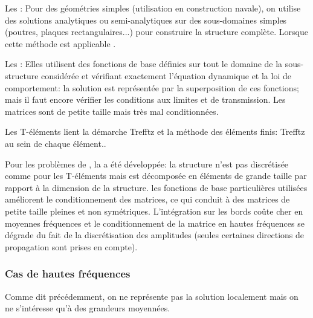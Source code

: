 \bigskip
Les : Pour des géométries simples (utilisation en construction navale), on utilise des solutions analytiques ou semi-analytiques sur des sous-domaines simples (poutres, plaques rectangulaires...) pour construire la structure complète. Lorsque cette méthode est applicable .

\bigskip
Les : Elles utilisent des fonctions de base définies sur tout le domaine de la sous-structure considérée et vérifiant exactement l'équation dynamique et la loi de comportement: la solution est représentée par la superposition de ces fonctions; mais il faut encore vérifier les conditions aux limites et de transmission. Les matrices sont de petite taille mais très mal conditionnées.

Les T-éléments lient la démarche Trefftz et la méthode des éléments finis: Trefftz au sein de chaque élément..

Pour les problèmes de , la  a été développée: la structure n'est pas discrétisée comme pour les T-éléments mais est décomposée en éléments de grande taille par rapport à la dimension de la structure. les fonctions de base particulières utilisées améliorent le conditionnement des matrices, ce qui conduit à des matrices de petite taille pleines et non symétriques. L'intégration sur les bords coûte cher en moyennes fréquences et le conditionnement de la matrice en hautes fréquences se dégrade du fait de la discrétisation des amplitudes (seules certaines directions de propagation sont prises en compte).

\medskip
\subsubsection{Cas de hautes fréquences}

Comme dit précédemment, on ne représente pas la solution localement mais on ne s'intéresse qu'à des grandeurs moyennées.

